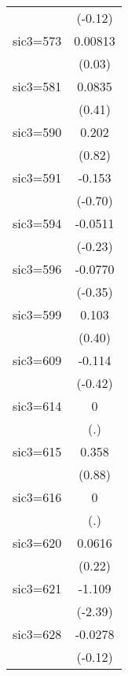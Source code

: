 \begin{table}[htbp]
\begin{tabular*}{0.8\hsize}{@{\hskip\tabcolsep\extracolsep\fill}l*{1}{c}}
                    &     (-0.12)         \\
\addlinespace
sic3=573            &     0.00813         \\
                    &      (0.03)         \\
\addlinespace
sic3=581            &      0.0835         \\
                    &      (0.41)         \\
\addlinespace
sic3=590            &       0.202         \\
                    &      (0.82)         \\
\addlinespace
sic3=591            &      -0.153         \\
                    &     (-0.70)         \\
\addlinespace
sic3=594            &     -0.0511         \\
                    &     (-0.23)         \\
\addlinespace
sic3=596            &     -0.0770         \\
                    &     (-0.35)         \\
\addlinespace
sic3=599            &       0.103         \\
                    &      (0.40)         \\
\addlinespace
sic3=609            &      -0.114         \\
                    &     (-0.42)         \\
\addlinespace
sic3=614            &           0         \\
                    &         (.)         \\
\addlinespace
sic3=615            &       0.358         \\
                    &      (0.88)         \\
\addlinespace
sic3=616            &           0         \\
                    &         (.)         \\
\addlinespace
sic3=620            &      0.0616         \\
                    &      (0.22)         \\
\addlinespace
sic3=621            &      -1.109\sym{*}  \\
                    &     (-2.39)         \\
\addlinespace
sic3=628            &     -0.0278         \\
                    &     (-0.12)         \\

\end{tabular*}
\end{table}
